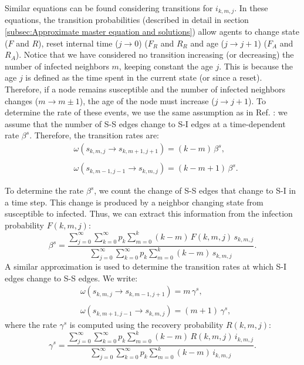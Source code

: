     Similar equations can be found considering transitions for $i_{k,m,j}$. In these equations, the transition probabilities (described in detail in section \ref{subsec:Approximate master equation and solutions}) allow agents to change state ($F$ and $R$), reset internal time ($j \to 0$) ($F_R$ and $R_R$ and age ($j \to j + 1$) ($F_A$ and $R_A$). Notice that we have considered no transition increasing (or decreasing) the number of infected neighbors $m$, keeping constant the age $j$. This is because the age $j$ is defined as the time spent in the current state (or since a reset). Therefore, if a node remains susceptible and the number of infected neighbors changes ($m \to m \pm 1$), the age of the node must increase ($j \to j + 1$). To determine the rate of these events, we use the same assumption as in Ref. \cite{gleeson-2013}: we assume that the number of S-S edges change to S-I edges at a time-dependent rate $\beta^s$. Therefore, the transition rates are:
    \begin{align} \label{rate_beta_s}
    &  \omega (s_{k,m,j} \to s_{k,m+1,j+1}) = (k - m) \, \beta^s, \nonumber \\
    \\
    & \omega (s_{k,m-1,j-1} \to s_{k,m,j}) = (k - m + 1)\, \beta^s . \nonumber 
    \end{align}
    
    To determine the rate $\beta^s$, we count the change of S-S edges that change to S-I in a time step. This change is produced by a neighbor changing state from susceptible to infected. Thus, we can extract this information from the infection probability $F (k,m,j) $:
    \begin{equation}
        \label{beta_s}
        \beta^s = \frac{\sum_{j=0}^{\infty} \sum_{k=0}^{\infty} p_k \sum_{m = 0}^{k} (k - m)\, F (k,m,j) \, s_{k,m,j}}{\sum_{j=0}^{\infty} \sum_{k=0}^{\infty} p_k \sum_{m = 0}^{k} (k - m) \, s_{k,m,j}}.
    \end{equation}
    A similar approximation is used to determine the transition rates at which S-I edges change to S-S edges. We write:
    \begin{align} \label{rate_gamma_s}
    &  \omega (s_{k,m,j} \to s_{k,m-1,j+1}) = m\, \gamma^{s}, \nonumber \\
    \\
    & \omega (s_{k,m+1,j-1} \to s_{k,m,j}) = (m + 1)\, \gamma^{s} , \nonumber
    \end{align}
    where the rate $\gamma^s$ is computed using the recovery probability $R (k,m,j)$:
    \begin{equation}
        \label{gamma_s}
        \gamma^s = \frac{\sum_{j=0}^{\infty} \sum_{k=0}^{\infty} p_k \sum_{m = 0}^{k} (k - m)\, R (k,m,j)\, i_{k,m,j}}{\sum_{j=0}^{\infty} \sum_{k=0}^{\infty} p_k \sum_{m = 0}^{k} (k - m)\,  i_{k,m,j}}.
    \end{equation}
    
